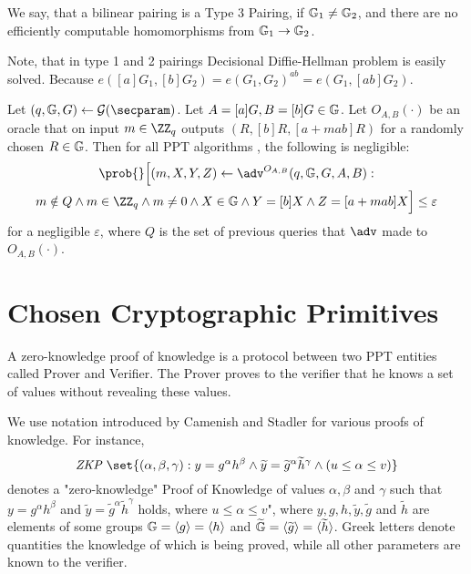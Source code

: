 \begin{definition}
We say, that a bilinear pairing is a Type 3 Pairing, if $\mathbb{G}_1 \neq \mathbb{G}_2$, and there are no efficiently computable homomorphisms from $\mathbb{G}_1 \rightarrow \mathbb{G}_2$.
\end{definition}
Note, that in type 1 and 2 pairings Decisional Diffie-Hellman problem is easily solved. Because $e([a]G_1, [b]G_2) = e(G_1, G_2)^{ab} = e(G_1, [ab]G_2)$.

\begin{assumption} \label{def:lrsw}
Let $(q, \Group, G) \gets \setup(\secparam)$. Let $A = [a]G, B = [b]G \in \mathbb{G}$. Let $O_{A, B}(\cdot)$ be an oracle that on input $m \in \ZZ_q$ outputs $(R, [b]R, [a + mab]R)$ for a randomly chosen $R \in \mathbb{G}$. Then for all \textsc{PPT} algorithms \adv, the following is negligible:
\begin{multline*}
\prob{} \Big[ (m, X, Y, Z) \gets \adv^{O_{A, B}} (q, \Group, G, A, B): \\ 
m \notin Q \wedge m \in \ZZ_q \wedge m \neq 0 \wedge X \in \Group \wedge Y = [b]X \wedge Z = [a + mab]X \Big] \leq \varepsilon
\end{multline*}
for a negligible $\varepsilon$, where $Q$ is the set of previous queries that $\adv$ made to $O_{A, B}(\cdot)$.
\end{assumption}


\section{Chosen Cryptographic Primitives}

\begin{definition}
A zero-knowledge proof of knowledge is a protocol between two \textsc{PPT} entities called Prover and Verifier. The Prover proves to the verifier that he knows a set of values without revealing these values. 

We use notation introduced by Camenish and Stadler \cite{cs-notation-zkp} for various proofs of knowledge. For instance,
$$\textit{ZKP } \set{ (\alpha, \beta, \gamma): y = g^\alpha h^\beta \wedge \widetilde y = \widetilde g^\alpha \widetilde h^\gamma \wedge (u \leq \alpha \leq v) }$$
denotes a "zero-knowledge" Proof of Knowledge of values $\alpha, \beta$ and $\gamma$ such that $y = g^\alpha h^\beta$ and $\widetilde y = \widetilde g^\alpha \widetilde h^\gamma$ holds, where $u \leq \alpha \leq v$", where $y, g, h, \widetilde y, \widetilde g$ and $\widetilde h$ are elements of some groups $\mathbb{G} = \langle g \rangle = \langle h \rangle$ and $\widetilde {\mathbb{G}} = \langle \widetilde g \rangle = \langle \widetilde h \rangle $. Greek letters denote quantities the knowledge of which is being proved, while all other parameters are known to the verifier.
\end{definition}

